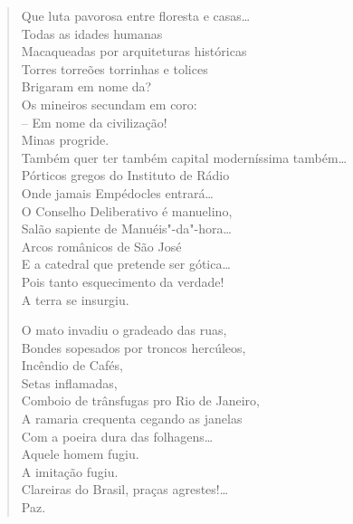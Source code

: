 {\begin{verse}
Que luta pavorosa entre floresta e casas\ldots{}\\
Todas as idades humanas\\
Macaqueadas por arquiteturas históricas\\
Torres torreões torrinhas e tolices\\
Brigaram em nome da?\\
Os mineiros secundam em coro:\\
-- Em nome da civilização!\\
Minas progride.\\
Também quer ter também capital moderníssima também\ldots{}\\
Pórticos gregos do Instituto de Rádio\\
Onde jamais Empédocles entrará\ldots{}\\
O Conselho Deliberativo é manuelino,\\
Salão sapiente de Manuéis"-da"-hora\ldots{}\\
Arcos românicos de São José\\
E a catedral que pretende ser gótica\ldots{}\\
Pois tanto esquecimento da verdade!\\
A terra se insurgiu.

O mato invadiu o gradeado das ruas,\\
Bondes sopesados por troncos hercúleos,\\
Incêndio de Cafés,\\
Setas inflamadas,\\
Comboio de trânsfugas pro Rio de Janeiro,\\
A ramaria crequenta cegando as janelas\\
Com a poeira dura das folhagens\ldots{}\\
Aquele homem fugiu.\\
A imitação fugiu.\\
Clareiras do Brasil, praças agrestes!\ldots{}\\
Paz.


\end{verse}}
